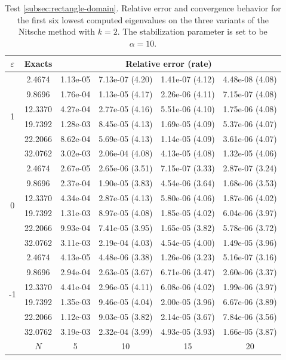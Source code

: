 \documentclass[onefignum,onetabnum,final]{siamart250211}
\numberwithin{equation}{section}
\newcommand\0{\boldsymbol{0}}
\begin{document}
	\begin{table}[!hbt]
		\centering
		{\setlength{\tabcolsep}{3.8pt}\footnotesize
			\caption{Test \ref{subsec:rectangle-domain}. Relative error and convergence behavior for the first six lowest computed eigenvalues on the three variants of the Nitsche method with $k=2$. The stabilization parameter is set to be $\alpha=10$.}
			\label{tabla:square-convergence-k2}
			\begin{tabular}{|c|c|cccc|}
				\hline
				$\varepsilon$& Exacts & \multicolumn{4}{c|}{Relative error (rate)} \\
				\hline
				\multirow{6}{0.02\linewidth}{1}&    2.4674 &   1.13e-05  &   7.13e-07 (4.20) &   1.41e-07 (4.12) &   4.48e-08 (4.08)   \\
				&    9.8696 &   1.76e-04  &   1.13e-05 (4.17) &   2.26e-06 (4.11) &   7.15e-07 (4.08)   \\
				&   12.3370 &   4.27e-04  &   2.77e-05 (4.16) &   5.51e-06 (4.10) &   1.75e-06 (4.08)   \\
				&   19.7392 &   1.28e-03  &   8.45e-05 (4.13) &   1.69e-05 (4.09) &   5.37e-06 (4.07)   \\
				&   22.2066 &   8.62e-04  &   5.69e-05 (4.13) &   1.14e-05 (4.09) &   3.61e-06 (4.07)   \\
				&   32.0762 &   3.02e-03  &   2.06e-04 (4.08) &   4.13e-05 (4.08) &   1.32e-05 (4.06)   \\
				\hline
				\multirow{6}{0.02\linewidth}{0}&    2.4674 &   2.67e-05  &   2.65e-06 (3.51) &   7.15e-07 (3.33) &   2.87e-07 (3.24)   \\
				&    9.8696 &   2.37e-04  &   1.90e-05 (3.83) &   4.54e-06 (3.64) &   1.68e-06 (3.53)   \\
				&   12.3370 &   4.34e-04  &   2.87e-05 (4.13) &   5.80e-06 (4.06) &   1.87e-06 (4.02)   \\
				&   19.7392 &   1.31e-03  &   8.97e-05 (4.08) &   1.85e-05 (4.02) &   6.04e-06 (3.97)   \\
				&   22.2066 &   9.93e-04  &   7.41e-05 (3.95) &   1.65e-05 (3.82) &   5.78e-06 (3.72)   \\
				&   32.0762 &   3.11e-03  &   2.19e-04 (4.03) &   4.54e-05 (4.00) &   1.49e-05 (3.96)   \\
				\hline
				\multirow{6}{0.02\linewidth}{-1}&    2.4674 &   4.13e-05  &   4.48e-06 (3.38) &   1.26e-06 (3.23) &   5.16e-07 (3.16)   \\
				&    9.8696 &   2.94e-04  &   2.63e-05 (3.67) &   6.71e-06 (3.47) &   2.60e-06 (3.37)   \\
				&   12.3370 &   4.41e-04  &   2.96e-05 (4.11) &   6.08e-06 (4.02) &   1.99e-06 (3.97)   \\
				&   19.7392 &   1.35e-03  &   9.46e-05 (4.04) &   2.00e-05 (3.96) &   6.67e-06 (3.89)   \\
				&   22.2066 &   1.12e-03  &   9.03e-05 (3.82) &   2.14e-05 (3.67) &   7.84e-06 (3.56)   \\
				&   32.0762 &   3.19e-03  &   2.32e-04 (3.99) &   4.93e-05 (3.93) &   1.66e-05 (3.87)   \\
				\hline
				&$N$&5&10&15 &20\\
				\hline
				\hline
		\end{tabular}}
		

\end{table}
\end{document}
